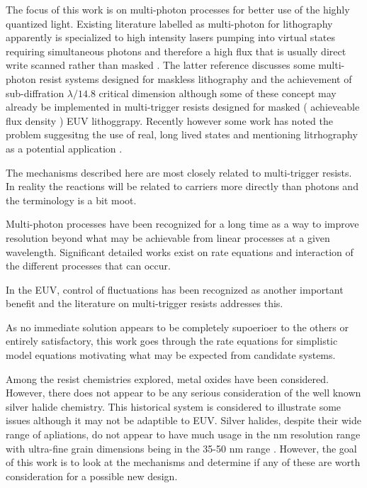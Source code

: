 The focus of this work is on multi-photon processes for better
use of the highly quantized light. Existing literature labelled
as multi-photon for lithography apparently is specialized to 
 high intensity lasers pumping into
virtual states requiring simultaneous photons and therefore a high
flux that is usually direct write scanned rather than masked
\cite{Zuev_Nguyen_Putlyaev_printing_bioprinting_2020}
\cite{Ritschdorff_Nielson_Shear_Multi_focal_multiphoton_lithography_2012}
\cite{Guan_Cao_Liu_Light_matter_2024}
. 
The latter reference \cite{Guan_Cao_Liu_Light_matter_2024}
discusses some multi-photon resist systems designed for
maskless lithography and the achievement of sub-diffration
$\lambda /14.8$ critical dimension although some of these concept
may already be implemented in multi-trigger resists
designed for masked ( achieveable flux density ) EUV lithoggrapy.
Recently however some work has noted the problem suggesitng the 
use of real, long lived states and mentioning litrhography
as a potential application \cite{2025arXiv250118706W}
.

The mechanisms described here are most closely related
to multi-trigger resists. In reality the reactions will be 
related to carriers more directly than photons and the 
terminology is a bit moot. 

Multi-photon processes have been recognized for a long time as a way
to improve resolution beyond what may be achievable from linear
processes at a given wavelength. Significant detailed works exist
on rate equations and interaction of the different processes that
can occur. 

 
In the EUV, control of fluctuations has been recognized as another 
important benefit and the literature on multi-trigger resists
addresses this. 

As no immediate solution appears to be completely supoerioer to the others
or entirely satisfactory, this work goes through the rate equations
for simplistic model equations motivating what may be expected from
candidate systems. 

Among the resist chemistries explored, metal oxides have been considered.
However, there does not appear to be any serious consideration of the
well known silver halide chemistry. This historical system is considered
to illustrate some issues although it may not be adaptible to EUV.
Silver halides, despite their wide range of apliations, do not appear to have much usage in the nm resolution range with ultra-fine grain dimensions  being in the 35-50 nm range \cite{Kuge_Morimoto_Sensitization_ultra_fine_2017}.
However, the goal of this work is to look at the mechanisms and determine
if any of these are worth consideration for a possible new design.


